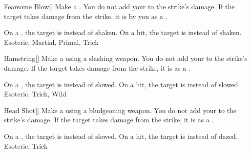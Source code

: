 \lowercase{\hypertarget{maneuver:Fearsome Blow}{}}\label{maneuver:Fearsome Blow}
\hypertarget{maneuver:Fearsome Blow}{}
\begin{freeability}[Rank 3]{Fearsome Blow}[]
Make a .
You do not add your  to the strike's damage.
If the target takes damage from the strike, it is  by you as a .

\rankline
{} On a , the target is  instead of shaken.
 On a hit, the target is  instead of shaken.
 Esoteric, Martial, Primal, Trick
\end{freeability}
\vspace{0.25em}



\lowercase{\hypertarget{maneuver:Hamstring}{}}\label{maneuver:Hamstring}
\hypertarget{maneuver:Hamstring}{}
\begin{freeability}[Rank 3]{Hamstring}[]
Make a  using a slashing weapon.
You do not add your  to the strike's damage.
If the target takes damage from the strike, it is  as a .

\rankline
{} On a , the target is  instead of slowed.
 On a hit, the target is  instead of slowed.
 Esoteric, Trick, Wild
\end{freeability}
\vspace{0.25em}



\lowercase{\hypertarget{maneuver:Head Shot}{}}\label{maneuver:Head Shot}
\hypertarget{maneuver:Head Shot}{}
\begin{freeability}[Rank 3]{Head Shot}[]
Make a  using a bludgeoning weapon.
You do not add your  to the strike's damage.
If the target takes damage from the strike, it is  as a .

\rankline
{} On a , the target is  instead of slowed.
 On a hit, the target is  instead of dazed.
 Esoteric, Trick
\end{freeability}
\vspace{0.25em}



